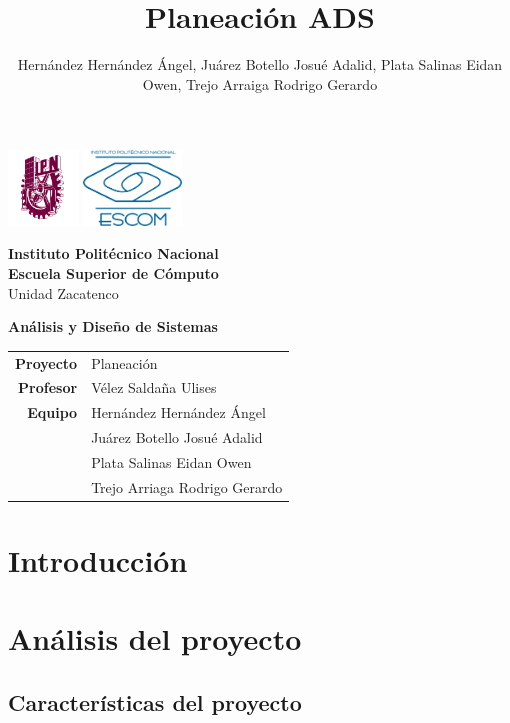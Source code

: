 \documentclass{article}
\author{Hernández Hernández Ángel, Juárez Botello Josué Adalid, Plata Salinas Eidan Owen, Trejo Arraiga Rodrigo Gerardo}
\title{Planeación ADS}
\begin{document}
\begin{titlepage}
	\centering
	\includegraphics[height=2cm]{Logo_IPN.png}
	\hfill
	\includegraphics[height=2cm]{escudoESCOM.png}

	\vspace{-1.5cm}
	\large\textbf{ Instituto Politécnico Nacional}\\
	\large\textbf{Escuela Superior de Cómputo}\\
	\large{Unidad Zacatenco}

	\vspace{2cm}

	\Large{\textbf{Análisis y Diseño de Sistemas}}

	\vspace{10cm}

	\begin{tabular}{rl}
		\textbf{Proyecto} & Planeación                    \\
		\textbf{Profesor} & Vélez Saldaña Ulises          \\
		\textbf{Equipo}
		                  & Hernández Hernández Ángel     \\
		                  & Juárez Botello Josué Adalid   \\
		                  & Plata Salinas Eidan Owen      \\
		                  & Trejo Arriaga Rodrigo Gerardo \\
	\end{tabular}
\end{titlepage}

\tableofcontents
\pagebreak

\section{Introducción}
\section{Análisis del proyecto}
\subsection{Características del proyecto}
\end{document}
